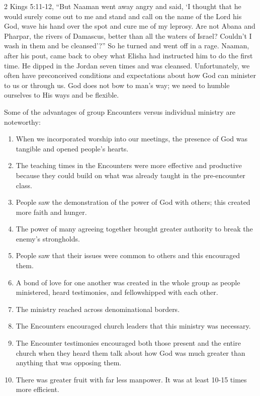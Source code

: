 \documentclass[twoside, 12pt]{book}
\begin{document}
2 Kings 5:11-12,  “But Naaman went away angry and said, ‘I thought that he would surely come out to me and stand and call on the name of the Lord his God, wave his hand over the spot and cure me of my leprosy. Are not Abana and Pharpar, the rivers of Damascus, better than all the waters of Israel? Couldn’t I wash in them and be cleansed’?” So he turned and went off in a rage. Naaman, after his pout, came back to obey what Elisha had instructed him to do the first time. He dipped in the Jordan seven times and was cleansed. Unfortunately, we often have preconceived conditions and expectations about how God can minister to us or through us. God does not bow to man’s way; we need to humble ourselves to His ways and be flexible.

Some of the advantages of  group Encounters versus individual ministry are noteworthy:
\begin{enumerate}
	\item When we incorporated worship into our meetings, the presence of God was tangible and opened people’s hearts.
	\item The teaching times in the Encounters were more effective and productive because they could build on what was already taught in the pre-encounter class.
	\item People saw the demonstration of the power of God with others; this created more faith and hunger.
	\item The power of many agreeing together brought greater authority to break the enemy’s strongholds.
	\item People saw that their issues were common to others and this encouraged them.
	\item A bond of love for one another was created in the whole group as people ministered, heard testimonies, and fellowshipped with each other.
	\item The ministry reached across denominational borders. 
	\item The Encounters encouraged church leaders that this ministry was necessary.
	\item The Encounter testimonies encouraged both those present and the entire church when they heard them talk about how God was much greater than anything that was opposing them.
	\item There was greater fruit with far less manpower. It was at least 10-15 times more efficient.
\end{enumerate}
\end{document}
